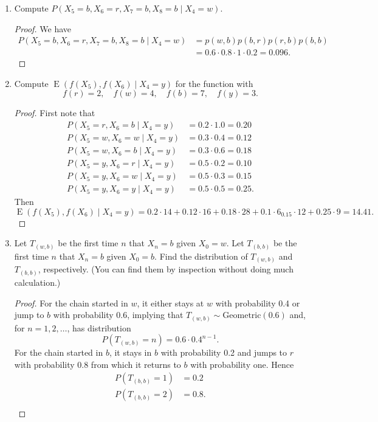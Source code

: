 \documentclass[oneside,reqno]{amsart}
\DeclareMathOperator{\E}{\mathrm{E}}
\newcommand{\Geom}{\text{Geometric}}
\theoremstyle{definition}
\begin{document}
\begin{enumerate}
\item
Compute $P(X_5 = b, X_6 = r, X_7 = b, X_8 = b \mid X_4 = w)$.
\begin{proof}
We have 
\begin{align*}
	P(X_5 = b, X_6 = r, X_7 = b, X_8 = b \mid X_4 = w) &= p(w,b)p(b,r)p(r,b) p(b,b) \\
	&= 0.6 \cdot 0.8 \cdot 1 \cdot 0.2 = 0.096.
\end{align*}
\end{proof}
\item
Compute $\E(f(X_5), f(X_6) \mid X_4 = y)$ for the function with 
\[
	f(r) = 2, \quad f(w) = 4, \quad f(b) = 7, \quad f(y) =3.
\]
\begin{proof}
First note that
\begin{align*}
	P(X_5 = r, X_6 = b \mid X_4 = y) &= 0.2 \cdot 1.0  =  0.20 \\
	P(X_5 = w, X_6 = w \mid X_4 = y) &= 0.3 \cdot 0.4 = 0.12 \\
	P(X_5 = w, X_6 = b \mid X_4 = y) &= 0.3 \cdot 0.6 = 0.18 \\	
	P(X_5 = y, X_6 = r \mid X_4 = y) &= 0.5 \cdot 0.2 = 0.10 \\
	P(X_5 = y, X_6 = w \mid X_4 = y) &= 0.5 \cdot 0.3 = 0.15 \\
	P(X_5 = y, X_6 = y \mid X_4 = y) &= 0.5 \cdot 0.5 = 0.25.
\end{align*}
Then
\[
	\E(f(X_5), f(X_6) \mid X_4 = y) = 0.2 \cdot 14 + 0.12 \cdot 16 + 0.18 \cdot 28 + 0.1 \cdot 6 _ 0.15 \cdot 12 + 0.25 \cdot 9 = 14.41.
\]
\end{proof}
\item
Let $T_{(w,b)}$ be the first time $n$ that $X_n = b$ given $X_0 = w$. Let $T_{(b,b)}$ be the first time $n$ that $X_n = b$ given $X_0 = b$. Find the distribution of $T_{(w,b)}$ and $T_{(b,b)}$, respectively. (You can find them by inspection without doing much calculation.)
\begin{proof}
For the chain started in $w$, it either stays at $w$ with probability 0.4 or jump to $b$ with probability 0.6, implying that $T_{(w,b)} \sim \Geom(0.6)$ and, for $n=1,2,\dotsc$, has distribution 
\[
	P(T_{(w,b)} = n) = 0.6 \cdot 0.4^{n-1}.
\]
For the chain started in $b$, it stays in $b$ with probability 0.2 and jumps to $r$ with probability 0.8 from which it returns to $b$ with probability one. Hence 
\begin{align*}
	P(T_{(b,b)} = 1) &= 0.2 \\
	P(T_{(b,b)} = 2) &= 0.8. \\
\end{align*}
\end{proof}
\end{enumerate}
\end{document}
